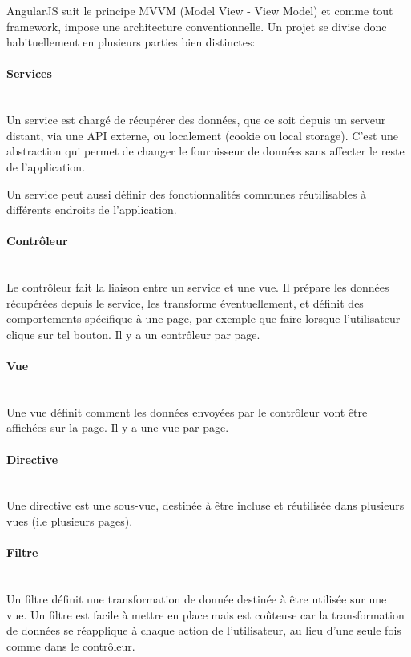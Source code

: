 \documentclass[a4paper,french,12pt]{article}
\begin{document}
	AngularJS suit le principe MVVM (Model View - View Model) et comme tout framework, impose une architecture conventionnelle.
	Un projet se divise donc habituellement en plusieurs parties bien distinctes:
	
	\paragraph{Services}~\\
	Un service est chargé de récupérer des données, que ce soit depuis un serveur distant, via une API externe, ou localement (cookie ou local storage). C'est une abstraction qui permet de changer le fournisseur de données sans affecter le reste de l'application.
	
	Un service peut aussi définir des fonctionnalités communes réutilisables à différents endroits de l'application.
	
	\paragraph{Contrôleur}~\\
	Le contrôleur fait la liaison entre un service et une vue. Il prépare les données récupérées depuis le service, les transforme éventuellement, et définit des comportements spécifique à une page, par exemple que faire lorsque l'utilisateur clique sur tel bouton. Il y a un contrôleur par page.
	
	\paragraph{Vue}~\\
	Une vue définit comment les données envoyées par le contrôleur vont être affichées sur la page. Il y a une vue par page.
	
	\paragraph{Directive}~\\
	Une directive est une sous-vue, destinée à être incluse et réutilisée dans plusieurs vues (i.e plusieurs pages).
	
	\paragraph{Filtre}~\\
	Un filtre définit une transformation de donnée destinée à être utilisée sur une vue. Un filtre est facile à mettre en place mais est coûteuse car la transformation de données se réapplique à chaque action de l'utilisateur, au lieu d'une seule fois comme dans le contrôleur.
	
\end{document}
